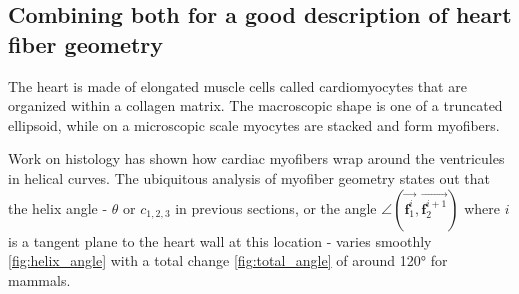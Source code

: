 \subsection{Combining both for a good description of heart fiber geometry}

The heart is made of elongated muscle cells called cardiomyocytes that are organized within a collagen matrix. The macroscopic shape is one of a truncated ellipsoid, while on a microscopic scale myocytes are stacked and form myofibers.

Work on histology has shown how cardiac myofibers wrap around the ventricules in helical curves. The ubiquitous analysis of myofiber geometry states out that the helix angle - $\theta$ or $c_{1,2,3}$ in previous sections, or the angle $\angle (\overrightarrow{\mathbf{f}^{i}_1}, \overrightarrow{\mathbf{f}^{i+1}_2})$ where $i$ is a tangent plane to the heart wall at this location - varies smoothly \ref{fig:helix_angle} with a total change \ref{fig:total_angle} of around 120° for mammals.
